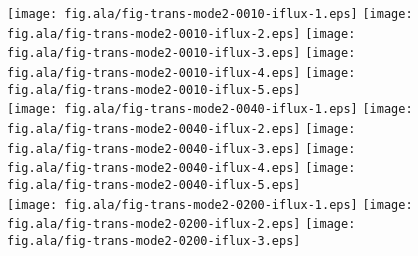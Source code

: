\documentclass[aip,jcp,a4paper,preprint,onecolumn]{revtex4-1}
\begin{document}
\begin{figure}
  \centering
  \texttt{[image: fig.ala/fig-trans-mode2-0010-iflux-1.eps]}
  \texttt{[image: fig.ala/fig-trans-mode2-0010-iflux-2.eps]}
  \texttt{[image: fig.ala/fig-trans-mode2-0010-iflux-3.eps]}
  \texttt{[image: fig.ala/fig-trans-mode2-0010-iflux-4.eps]}
  \texttt{[image: fig.ala/fig-trans-mode2-0010-iflux-5.eps]}\\
  \texttt{[image: fig.ala/fig-trans-mode2-0040-iflux-1.eps]}
  \texttt{[image: fig.ala/fig-trans-mode2-0040-iflux-2.eps]}
  \texttt{[image: fig.ala/fig-trans-mode2-0040-iflux-3.eps]}
  \texttt{[image: fig.ala/fig-trans-mode2-0040-iflux-4.eps]}
  \texttt{[image: fig.ala/fig-trans-mode2-0040-iflux-5.eps]}\\
  \texttt{[image: fig.ala/fig-trans-mode2-0200-iflux-1.eps]}
  \texttt{[image: fig.ala/fig-trans-mode2-0200-iflux-2.eps]}
  \texttt{[image: fig.ala/fig-trans-mode2-0200-iflux-3.eps]}

\end{figure}
\end{document}
